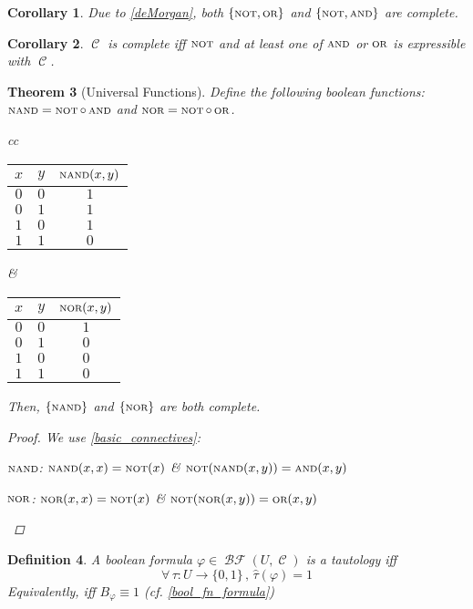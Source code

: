 \documentclass[12pt]{article}
\newcommand{\Forall}[1]{\forall\,{#1}\,,\,}
\newcommand{\scr}[1]{{\scriptstyle\textup{#1}}}
\DeclareMathOperator{\C}{\mathcal{C}}
\DeclareMathOperator{\BF}{\mathcal{BF}}
\DeclareMathOperator{\NOT}{\scr{NOT}}
\DeclareMathOperator{\OR}{\scr{OR}}
\DeclareMathOperator{\AND}{\scr{AND}}
\DeclareMathOperator{\NOR}{\scr{NOR}}
\DeclareMathOperator{\NAND}{\scr{NAND}}
\newcommand*{\B}{\{0,1\}}
\newtheorem{theorem}{Theorem}[subsection]
\newtheorem{definition}[theorem]{Definition}
\newtheorem{corollary}[theorem]{Corollary}
\begin{document}
\begin{corollary}
  Due to \ref{deMorgan}, both $\{\NOT,\OR\}$ and $\{\NOT,\AND\}$ are complete.
\end{corollary}

\begin{corollary}
  $\C$ is complete iff $\NOT$ and at least one of $\AND$ or $\OR$ is expressible with $\C$.
\end{corollary}

\begin{theorem}[Universal Functions]
  Define the following boolean functions: $\NAND=\NOT\circ\AND$ and $\NOR=\NOT\circ\OR$.
  \begin{table}[H]
    \centering
    \begin{tabular}{cc}
      \begin{tabular}{c|c||c}
        $x$ & $y$ & $\NAND(x,y)$\\\hline
        $0$ & $0$ & $1$\\
        $0$ & $1$ & $1$\\
        $1$ & $0$ & $1$\\
        $1$ & $1$ & $0$
      \end{tabular}
      &
      \begin{tabular}{c|c||c}
        $x$ & $y$ & $\NOR(x,y)$\\\hline
        $0$ & $0$ & $1$\\
        $0$ & $1$ & $0$\\
        $1$ & $0$ & $0$\\
        $1$ & $1$ & $0$
      \end{tabular}
    \end{tabular}
  \end{table}
  
  \noindent Then, $\{\NAND\}$ and $\{\NOR\}$ are both complete.
  \begin{proof}
    We use \ref{basic_connectives}:
    \begin{compactitem}
      \item $\NAND$: $\NAND(x,x)=\NOT(x)$ \& $\NOT(\NAND(x,y))=\AND(x,y)$
      \item $\NOR$: $\NOR(x,x)=\NOT(x)$ \& $\NOT(\NOR(x,y))=\OR(x,y)$
    \end{compactitem}
  \end{proof}
\end{theorem}

\begin{definition}
  A boolean formula $\varphi\in\BF(U,\C)$ is a tautology iff $$\Forall{\tau:U\to\B}\hat{\tau}(\varphi)=1$$ Equivalently, iff $B_\varphi\equiv 1$ (cf. \ref{bool_fn_formula})
\end{definition}
\end{document}
